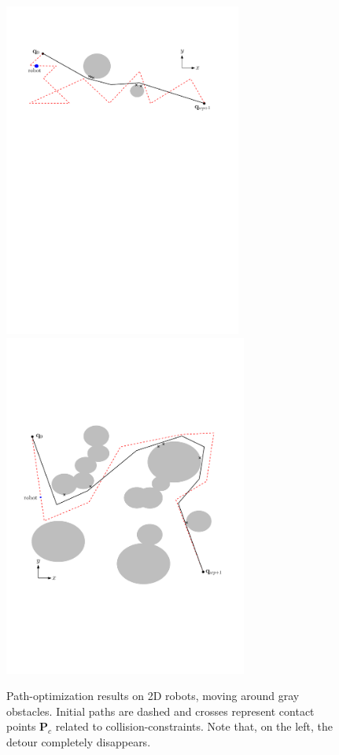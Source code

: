 \documentclass{tADR2e}
\newcommand\po{\mathbf{P}}
\begin{document}
\begin{figure}[b]
	\centering
	\includegraphics[width=7.8cm]{contact_points6.pdf}
	\includegraphics[width=8cm]{contact_points2potential.pdf}
	\caption{Path-optimization results on 2D robots, moving around 
	gray obstacles. Initial paths are dashed and crosses represent contact points 
	$\po_c$ related to collision-constraints. Note that, on the left, the detour 
	completely disappears.}
	\label{2D_long}
\end{figure}
\end{document}
